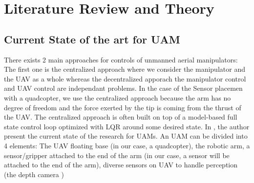 \section{Literature Review and Theory}
\subsection{Current State of the art for UAM}
There exists 2 main approaches for controls of unmanned aerial manipulators: The first one is the centralized approach where we consider the manipulator and the UAV as a whole whereas the decentralized apporach the manipulator control and UAV control are independant problems.
In the case of the Sensor placemen with a quadcopter, we use the centralized approach because the arm has no degree of freedom and the force exerted by the tip is coming from the thrust of the UAV.
The centralized approach is often built on top of a model-based full state control loop optimized with LQR around some desired state. 
In \cite{ruggiero2018aerial}, the author present the current state of the research for UAMs.
An UAM can be divided into 4 elements: The UAV floating base (in our case, a quadcopter), the robotic arm, a sensor/gripper attached to the end of the arm (in our case, a sensor will be attached to the end of the arm), diverse sensors on UAV to handle perception (the depth camera )
